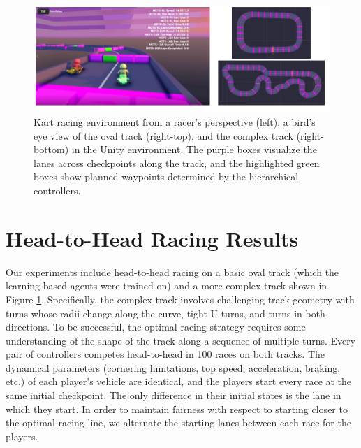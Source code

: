 \begin{figure}
  \centering
  \includegraphics[width=\textwidth]{Figures/UnityEnvironment.png}
  \caption[Screenshots of Unity simulation environment] {Kart racing environment from a racer's perspective (left), a bird's eye view of the oval track (right-top), and the complex track (right-bottom) in the Unity environment. The purple boxes visualize the lanes across checkpoints along the track, and the highlighted green boxes show planned waypoints determined by the hierarchical controllers.}
  \label{fig:experiment_tracks}
\end{figure}
\section{Head-to-Head Racing Results}
Our experiments include head-to-head racing on a basic oval track (which the learning-based agents were trained on) and a more complex track shown in Figure \ref{fig:experiment_tracks}. Specifically, the complex track involves challenging track geometry with turns whose radii change along the curve, tight U-turns, and turns in both directions. To be successful, the optimal racing strategy requires some understanding of the shape of the track along a sequence of multiple turns. Every pair of controllers competes head-to-head in 100 races on both tracks. The dynamical parameters (cornering limitations, top speed, acceleration, braking, etc.) of each player's vehicle are identical, and the players start every race at the same initial checkpoint. The only difference in their initial states is the lane in which they start. In order to maintain fairness with respect to starting closer to the optimal racing line, we alternate the starting lanes between each race for the players.

